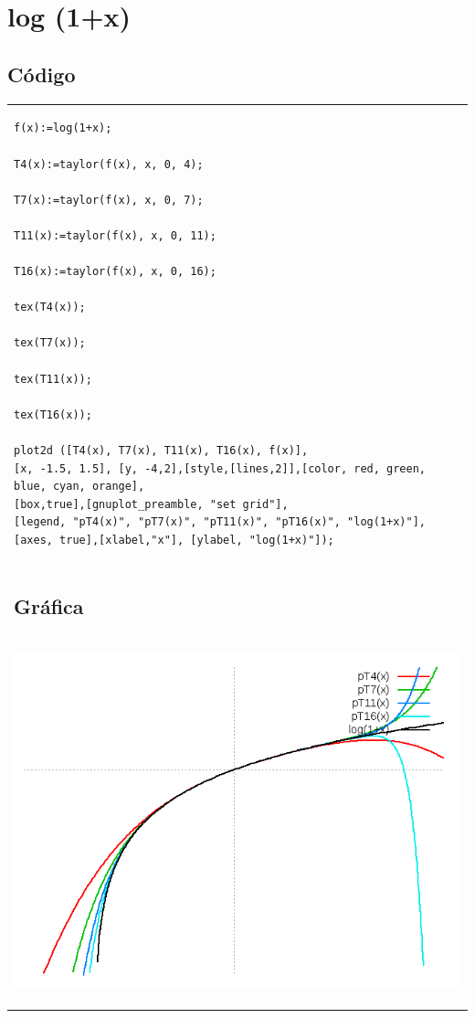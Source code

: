 \documentclass[10pt]{article}
\begin{document}
\section{log (1+x)}



\subsection{Código}
\begin{tabular}{l}
\begin{verbatim}  
f(x):=log(1+x);

T4(x):=taylor(f(x), x, 0, 4);

T7(x):=taylor(f(x), x, 0, 7);

T11(x):=taylor(f(x), x, 0, 11);

T16(x):=taylor(f(x), x, 0, 16);

tex(T4(x));

tex(T7(x));

tex(T11(x));

tex(T16(x));

plot2d ([T4(x), T7(x), T11(x), T16(x), f(x)], 
[x, -1.5, 1.5], [y, -4,2],[style,[lines,2]],[color, red, green, blue, cyan, orange],
[box,true],[gnuplot_preamble, "set grid"],
[legend, "pT4(x)", "pT7(x)", "pT11(x)", "pT16(x)", "log(1+x)"],
[axes, true],[xlabel,"x"], [ylabel, "log(1+x)"]);

\end{verbatim} \\
\subsection{Gráfica}\\
\begin{center}
  
    \includegraphics[scale=0.4]{log1}
\end{center}
\end{tabular}
\end{document}
